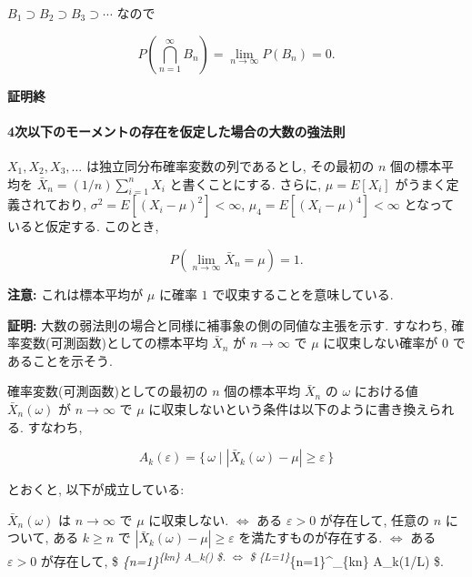 \documentclass[
  letterpaper,
  DIV=11,
  numbers=noendperiod]{scrartcl}
\let\oldparagraph\paragraph
\renewcommand{\paragraph}[1]{\oldparagraph{#1}\mbox{}}
\begin{document}
\(B_1\supset B_2\supset B_3\supset\cdots\) なので

\[
P\left(\bigcap_{n=1}^\infty B_n\right) = \lim_{n\to\infty} P(B_n) = 0.
\]

\textbf{証明終}

\hypertarget{ux6b21ux4ee5ux4e0bux306eux30e2ux30fcux30e1ux30f3ux30c8ux306eux5b58ux5728ux3092ux4eeeux5b9aux3057ux305fux5834ux5408ux306eux5927ux6570ux306eux5f37ux6cd5ux5247}{%
\paragraph{4次以下のモーメントの存在を仮定した場合の大数の強法則}\label{ux6b21ux4ee5ux4e0bux306eux30e2ux30fcux30e1ux30f3ux30c8ux306eux5b58ux5728ux3092ux4eeeux5b9aux3057ux305fux5834ux5408ux306eux5927ux6570ux306eux5f37ux6cd5ux5247}}

\(X_1,X_2,X_3,\ldots\) は独立同分布確率変数の列であるとし, その最初の
\(n\) 個の標本平均を \(\bar{X}_n = (1/n)\sum_{i=1}^n X_i\)
と書くことにする. さらに, \(\mu=E[X_i]\) がうまく定義されており,
\(\sigma^2=E[(X_i-\mu)^2]<\infty\), \(\mu_4 = E[(X_i-\mu)^4]<\infty\)
となっていると仮定する. このとき,

\[
P\left(\lim_{n\to\infty}\bar{X}_n = \mu\right) = 1.
\]

\textbf{注意:} これは標本平均が \(\mu\) に確率 \(1\)
で収束することを意味している.

\textbf{証明:} 大数の弱法則の場合と同様に補事象の側の同値な主張を示す.
すなわち, 確率変数(可測函数)としての標本平均 \(\bar{X}_n\) が
\(n\to\infty\) で \(\mu\) に収束しない確率が \(0\) であることを示そう.

確率変数(可測函数)としての最初の \(n\) 個の標本平均 \(\bar{X}_n\) の
\(\omega\) における値 \(\bar{X}_n(\omega)\) が \(n\to\infty\) で \(\mu\)
に収束しないという条件は以下のように書き換えられる. すなわち,

\[
A_k(\varepsilon) = \{\,\omega\mid |\bar{X}_k(\omega)-\mu|\ge\varepsilon\,\}
\]

とおくと, 以下が成立している:

\(\bar{X}_n(\omega)\) は \(n\to\infty\) で \(\mu\) に収束しない.
\(\iff\) ある \(\varepsilon>0\) が存在して, 任意の \(n\) について, ある
\(k\ge n\) で \(|\bar{X}_k(\omega)-\mu|\ge\varepsilon\)
を満たすものが存在する. \(\iff\) ある \(\varepsilon>0\) が存在して,
\$\displaystyle
\omega \in \bigcap\emph{\{n=1\}\textsuperscript{\infty \bigcup\emph{\{k\ge n\}
A\_k(\varepsilon) \$. \(\iff\) \$\displaystyle
\omega \in \bigcup}\{L=1\}}\infty \bigcap}\{n=1\}\^{}\infty \bigcup\_\{k\ge n\}
A\_k(1/L) \$.
\end{document}
